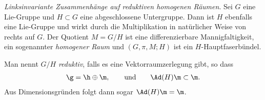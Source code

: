 \documentclass[%
	paper=a5,%
	fleqn,%
	DIV=18,%
	BCOR=0mm,
	fontsize=11pt,
	titlepage=false,%
	bibliography=totoc,
	DIV=18,%
	twoside=true,
	pdftitle=Riemannsche Geometrie,
	pdfauthor=Uwe Semmelmann,
	numbers=noendperiod]%
	{scrbook}
\begin{document}
\begin{ex}
\textit{Linksinvariante Zusammenhänge auf reduktiven homogenen Räumen}. Sei $G$
eine Lie-Gruppe und $H\subset G$ eine abgeschlossene Untergruppe. Dann ist $H$
ebenfalls eine Lie-Gruppe und wirkt durch die Multiplikation in
natürlicher Weise von rechts auf $G$. Der Quotient $M=G/H$ ist eine
differenzierbare Mannigfaltigkeit, ein sogenannter \emph{homogener Raum} und
$(G,\pi,M;H)$ ist ein $H$-Hauptfaserbündel.
\begin{figure}[ht]
\centering
{}
\end{figure}
Man nennt $G/H$ \emph{reduktiv}, falls es eine Vektorraumzerlegung gibt, so dass
\begin{align*}
\g = \h\oplus\m,\qquad \text{und}\qquad \Ad(H)\m\subset \m.
\end{align*}
Aus Dimensionsgründen folgt dann sogar $\Ad(H)\m = \m$.


\end{ex}
\end{document}
